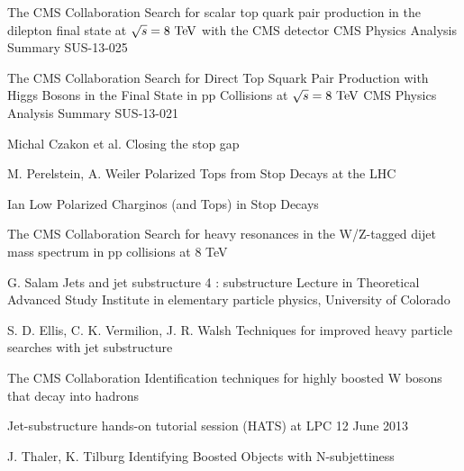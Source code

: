 \begin{thebibliography}{2}

             {The CMS Collaboration}
             {Search for scalar top quark pair production in the dilepton
             final state at $\sqrt{s} = 8~\text{TeV}$ with the CMS detector}
             {CMS Physics Analysis Summary SUS-13-025}

             {The CMS Collaboration}
             {Search for Direct Top Squark Pair Production with Higgs Bosons in the Final
             State in pp Collisions at $\sqrt{s} = 8~\text{TeV}$}
             {CMS Physics Analysis Summary SUS-13-021}

             {Michal Czakon et al.}
             {Closing the stop gap}
             {}

             {M. Perelstein, A. Weiler}
             {Polarized Tops from Stop Decays at the LHC}
             {}

             {Ian Low}
             {Polarized Charginos (and Tops) in Stop Decays}
             {}


             {The CMS Collaboration}
             {Search for heavy resonances in the W/Z-tagged dijet mass
             spectrum in pp collisions at 8 TeV}
             {}

             {G. Salam}
             {Jets and jet substructure 4 : substructure}
             {Lecture in Theoretical Advanced Study Institute in elementary particle physics,
             University of Colorado}

             {S. D. Ellis, C. K. Vermilion, J. R. Walsh}
             {Techniques for improved heavy particle searches with jet substructure}
             {}

             {The CMS Collaboration}
             {Identification techniques for highly boosted W bosons that decay into hadrons}
             {}

             {}
             {Jet-substructure hands-on tutorial session (HATS) at LPC}
             {12 June 2013}

             {J. Thaler, K. Tilburg}
             {Identifying Boosted Objects with N-subjettiness}
             {}








\end{thebibliography}




